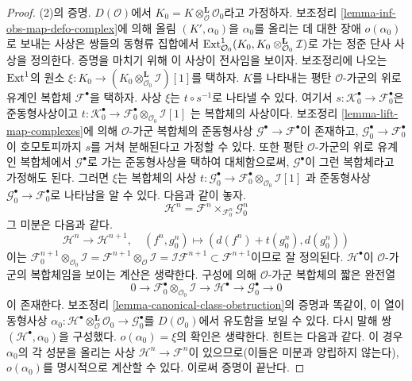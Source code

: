 \begin{proof}
\medskip\noindent
(2)의 증명. $D(\mathcal{O})$에서
$K_0 = K \otimes_\mathcal{O}^\mathbf{L} \mathcal{O}_0$라고 가정하자.
보조정리 \ref{lemma-inf-obs-map-defo-complex}에 의해 올림
$(K', \alpha_0)$을 $\alpha_0$를 올리는 데 대한 장애 $o(\alpha_0)$로
보내는 사상은 쌍들의 동형류 집합에서
$\mathop{\mathrm{Ext}}\nolimits^1_{\mathcal{O}_0}(K_0,
K_0 \otimes_{\mathcal{O}_0}^\mathbf{L} \mathcal{I})$로 가는
정준 단사 사상을 정의한다. 증명을 마치기 위해 이 사상이 전사임을
보이자. 보조정리에 나오는 $\mathop{\mathrm{Ext}}\nolimits^1$의 원소
$\xi : K_0 \to (K_0 \otimes_{\mathcal{O}_0}^\mathbf{L} \mathcal{I})[1]$를
택하자. $K$를 나타내는 평탄 $\mathcal{O}$-가군의 위로 유계인 복합체
$\mathcal{F}^\bullet$을 택하자. 사상 $\xi$는
$t \circ s^{-1}$로 나타낼 수 있다. 여기서
$s : \mathcal{K}_0^\bullet \to \mathcal{F}_0^\bullet$은
준동형사상이고
$t : \mathcal{K}_0^\bullet \to
\mathcal{F}_0^\bullet \otimes_{\mathcal{O}_0} \mathcal{I}[1]$
는 복합체의 사상이다. 보조정리 \ref{lemma-lift-map-complexes}에 의해
$\mathcal{O}$-가군 복합체의 준동형사상
$\mathcal{G}^\bullet \to \mathcal{F}^\bullet$이 존재하고,
$\mathcal{G}_0^\bullet \to \mathcal{F}_0^\bullet$이 호모토피까지
$s$를 거쳐 분해된다고 가정할 수 있다. 또한 평탄 $\mathcal{O}$-가군의
위로 유계인 복합체에서 $\mathcal{G}^\bullet$로 가는 준동형사상을
택하여 대체함으로써, $\mathcal{G}^\bullet$이 그런 복합체라고
가정해도 된다. 그러면 $\xi$는 복합체의 사상
$t : \mathcal{G}_0^\bullet \to
\mathcal{F}_0^\bullet \otimes_{\mathcal{O}_0} \mathcal{I}[1]$
과 준동형사상 $\mathcal{G}_0^\bullet \to \mathcal{F}_0^\bullet$로
나타남을 알 수 있다. 다음과 같이 놓자.
$$
\mathcal{H}^n = \mathcal{F}^n \times_{\mathcal{F}_0^n} \mathcal{G}_0^n
$$
그 미분은 다음과 같다.
$$
\mathcal{H}^n \to \mathcal{H}^{n + 1},\quad
(f^n, g_0^n) \mapsto (d(f^n) + t(g_0^n), d(g_0^n))
$$
이는
$\mathcal{F}_0^{n + 1} \otimes_{\mathcal{O}_0} \mathcal{I} =
\mathcal{F}^{n + 1} \otimes_\mathcal{O} \mathcal{I} =
\mathcal{I}\mathcal{F}^{n + 1} \subset \mathcal{F}^{n + 1}$이므로
잘 정의된다. $\mathcal{H}^\bullet$이 $\mathcal{O}$-가군의 복합체임을
보이는 계산은 생략한다. 구성에 의해 $\mathcal{O}$-가군 복합체의
짧은 완전열
$$
0 \to \mathcal{F}_0^\bullet \otimes_{\mathcal{O}_0} \mathcal{I} \to
\mathcal{H}^\bullet \to \mathcal{G}_0^\bullet \to 0
$$
이 존재한다. 보조정리 \ref{lemma-canonical-class-obstruction}의 증명과
똑같이, 이 열이 동형사상
$\alpha_0 :
\mathcal{H}^\bullet \otimes_\mathcal{O}^\mathbf{L} \mathcal{O}_0 \to
\mathcal{G}_0^\bullet$를 $D(\mathcal{O}_0)$에서 유도함을 보일 수 있다.
다시 말해 쌍 $(\mathcal{H}^\bullet, \alpha_0)$을 구성했다.
$o(\alpha_0) = \xi$의 확인은 생략한다. 힌트는 다음과 같다. 이 경우
$\alpha_0$의 각 성분을 올리는 사상
$\mathcal{H}^n \to \mathcal{F}^n$이 있으므로(이들은 미분과 양립하지
않는다), $o(\alpha_0)$를 명시적으로 계산할 수 있다. 이로써 증명이
끝난다.
\end{proof}


















